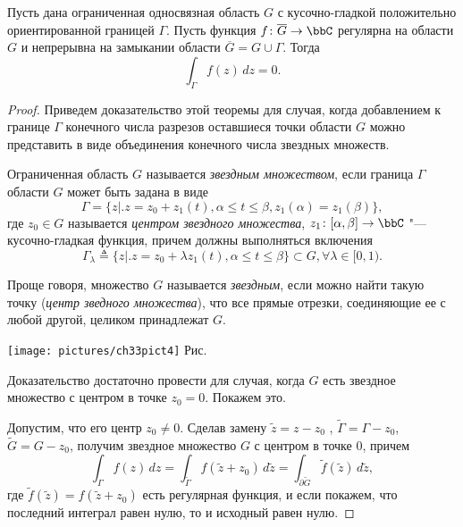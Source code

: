 \begin{thm}\label{abcd1}
Пусть дана ограниченная односвязная область $G$ с кусочно-гладкой положительно ориентированной границей $\Gamma$. Пусть функция $f\colon\overline{G}\to\bbC$ регулярна на области $G$ и непрерывна на замыкании области $\overline{G}=G\cup\Gamma$. Тогда
\begin{equation}
\label{abc10}
\int_{\Gamma} f(z)\,dz = 0.
\end{equation}
\end{thm}
\begin{proof}
Приведем доказательство этой теоремы для случая, когда добавлением к границе $\Gamma$ конечного числа разрезов оставшиеся точки области $G$ можно представить в виде объединения конечного числа звездных множеств. 
\begin{defn}
\label{abc8}
Ограниченная область $G$ называется \textit{звездным множеством}, если граница $\Gamma$ области $G$ может быть задана в виде
\begin{equation}
\label{abc5}
\Gamma = \{ z \bigr|\bigl. z = z_0+z_1(t),  \alpha \le t \le \beta, z_1(\alpha) = z_1 (\beta) \},
\end{equation} 
где $z_0 \in G$ называется \textit{центром звездного множества}, $z_1 \colon[\alpha, \beta] \to \bbC$ "--- кусочно-гладкая функция, причем должны выполняться включения
\begin{equation}
\label{abc7}
\Gamma_\lambda \triangleq \{ z \bigr|\bigl. z = z_0+\lambda z_1(t),  \alpha \le t \le \beta\} \subset G, \forall \lambda \in [0,1).
\end{equation}

Проще говоря, множество $G$ называется \textit{звездным}, если можно найти такую точку (\textit{центр зведного множества}), что все прямые отрезки, соединяющие ее с любой другой, целиком принадлежат $G$.
\end{defn}
\begin{center}
\texttt{[image: pictures/ch33pict4]} Рис. \thepictnumber
\end{center}

Доказательство достаточно провести для случая, когда $G$ есть звездное множество с центром в точке $z_0 = 0$. Покажем это. 

Допустим, что его центр $z_0 \ne 0$. Сделав  замену $\tilde z = z - z_0$ , $\tilde \Gamma = \Gamma - z_0$, $\tilde{G} = G - z_0$, получим звездное множество $G$ с центром в точке $0$, причем
$$
\int_{\Gamma} f(z)\,dz = \int_{\tilde \Gamma} f(\tilde z +z_0)\,d\tilde z = \int_{\partial\tilde G} \tilde f(\tilde z)\,d\tilde z ,
$$
где $\tilde f(\tilde z) = f(\tilde z + z_0 )$ есть регулярная функция, и если покажем, что последний интеграл равен нулю, то и исходный равен нулю.


\end{proof}
